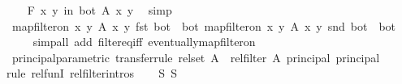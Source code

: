 \begin{isabellebody}
%
\isadelimproof
%
\endisadelimproof
%
\isatagproof
{}\isamarkupfalse%
\isanewline
\ \ \isamarkupfalse%
\ {\isachardoublequoteopen}{\isasymforall}\isactrlsub F\ {\isacharparenleft}{\kern0pt}x{\isacharcomma}{\kern0pt}\ y{\isacharparenright}{\kern0pt}\ in\ bot{\isachardot}{\kern0pt}\ A\ x\ y{\isachardoublequoteclose}\ \isamarkupfalse%
\ simp\isanewline
\ \ \isamarkupfalse%
\ {\isachardoublequoteopen}map{\isacharunderscore}{\kern0pt}filter{\isacharunderscore}{\kern0pt}on\ {\isacharbraceleft}{\kern0pt}{\isacharparenleft}{\kern0pt}x{\isacharcomma}{\kern0pt}\ y{\isacharparenright}{\kern0pt}{\isachardot}{\kern0pt}\ A\ x\ y{\isacharbraceright}{\kern0pt}\ fst\ bot\ {\isacharequal}{\kern0pt}\ bot{\isachardoublequoteclose}\ {\isachardoublequoteopen}map{\isacharunderscore}{\kern0pt}filter{\isacharunderscore}{\kern0pt}on\ {\isacharbraceleft}{\kern0pt}{\isacharparenleft}{\kern0pt}x{\isacharcomma}{\kern0pt}\ y{\isacharparenright}{\kern0pt}{\isachardot}{\kern0pt}\ A\ x\ y{\isacharbraceright}{\kern0pt}\ snd\ bot\ {\isacharequal}{\kern0pt}\ bot{\isachardoublequoteclose}\isanewline
\ \ \ \ \isamarkupfalse%
{\isacharparenleft}{\kern0pt}simp{\isacharunderscore}{\kern0pt}all\ add{\isacharcolon}{\kern0pt}\ filter{\isacharunderscore}{\kern0pt}eq{\isacharunderscore}{\kern0pt}iff\ eventually{\isacharunderscore}{\kern0pt}map{\isacharunderscore}{\kern0pt}filter{\isacharunderscore}{\kern0pt}on{\isacharparenright}{\kern0pt}\isanewline
{}\isamarkupfalse%
%
\endisatagproof
{\isafoldproof}%
%
\isadelimproof
\isanewline
%
\endisadelimproof
\isanewline
{}\isamarkupfalse%
\ principal{\isacharunderscore}{\kern0pt}parametric\ {\isacharbrackleft}{\kern0pt}transfer{\isacharunderscore}{\kern0pt}rule{\isacharbrackright}{\kern0pt}{\isacharcolon}{\kern0pt}\ {\isachardoublequoteopen}{\isacharparenleft}{\kern0pt}rel{\isacharunderscore}{\kern0pt}set\ A\ {\isacharequal}{\kern0pt}{\isacharequal}{\kern0pt}{\isacharequal}{\kern0pt}{\isachargreater}{\kern0pt}\ rel{\isacharunderscore}{\kern0pt}filter\ A{\isacharparenright}{\kern0pt}\ principal\ principal{\isachardoublequoteclose}\isanewline
%
\isadelimproof
%
\endisadelimproof
%
\isatagproof
{}\isamarkupfalse%
{\isacharparenleft}{\kern0pt}rule\ rel{\isacharunderscore}{\kern0pt}funI\ rel{\isacharunderscore}{\kern0pt}filter{\isachardot}{\kern0pt}intros{\isacharparenright}{\kern0pt}{\isacharplus}{\kern0pt}\isanewline
\ \ \isamarkupfalse%
\ S\ S{\isacharprime}{\kern0pt}\isanewline
\ \ \isamarkupfalse%

\end{isabellebody}
